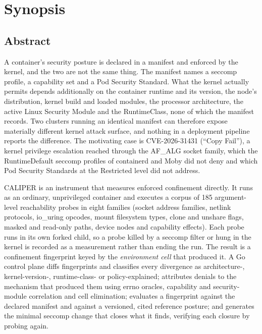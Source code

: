 \chapter{Synopsis}
\label{ch:synopsis}

\section{Abstract}

A container's security posture is declared in a manifest and enforced by the kernel, and the two are not the same thing. The manifest names a seccomp profile, a capability set and a Pod Security Standard. What the kernel actually permits depends additionally on the container runtime and its version, the node's distribution, kernel build and loaded modules, the processor architecture, the active Linux Security Module and the RuntimeClass, none of which the manifest records. Two clusters running an identical manifest can therefore expose materially different kernel attack surface, and nothing in a deployment pipeline reports the difference. The motivating case is CVE-2026-31431 (``Copy Fail''), a kernel privilege escalation reached through the AF\_ALG socket family, which the RuntimeDefault seccomp profiles of containerd and Moby did not deny and which Pod Security Standards at the Restricted level did not address.

CALIPER is an instrument that measures enforced confinement directly. It runs as an ordinary, unprivileged container and executes a corpus of 185 argument-level reachability probes in eight families (socket address families, netlink protocols, io\_uring opcodes, mount filesystem types, clone and unshare flags, masked and read-only paths, device nodes and capability effects). Each probe runs in its own forked child, so a probe killed by a seccomp filter or hung in the kernel is recorded as a measurement rather than ending the run. The result is a confinement fingerprint keyed by the \emph{environment cell} that produced it. A Go control plane diffs fingerprints and classifies every divergence as architecture-, kernel-version-, runtime-class- or policy-explained; attributes denials to the mechanism that produced them using errno oracles, capability and security-module correlation and cell elimination; evaluates a fingerprint against the declared manifest and against a versioned, cited reference posture; and generates the minimal seccomp change that closes what it finds, verifying each closure by probing again.

